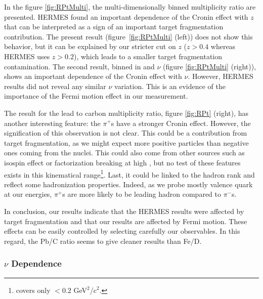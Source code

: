 In the figure \ref{fig:RPtMulti}, the multi-dimensionally binned multiplicity 
ratio are presented. HERMES found an important dependence of the Cronin effect 
with $z$ \cite{Airapetian:2007vu,Airapetian:2011jp} that can be interpreted as a 
sign of an important target fragmentation contribution. The present result 
(figure~\ref{fig:RPtMulti} (left)) does not show this behavior, but it can be 
explained by our stricter cut on $z$ ($z>0.4$ whereas HERMES uses $z>0.2$), which 
leads to a smaller target fragmentation contamination. The second result, 
binned in \pt and $\nu$ (figure \ref{fig:RPtMulti} (right)), shows an important 
dependence of the Cronin effect with $\nu$. However, HERMES results did not 
reveal any similar $\nu$ variation. This is an evidence of the importance of 
the Fermi motion effect in our measurement.

The result for the lead to carbon multiplicity ratio, figure \ref{fig:RPt} 
(right), has another interesting feature: the $\pi^+$s have a stronger Cronin 
effect. However, the signification of this observation is not clear. This could be 
a contribution from target fragmentation, as we might expect more positive 
particles than negative ones coming from the nuclei.
This could also come from other sources such as isospin effect or factorization breaking at high 
\ptp, but no test of these features exists in this kinematical range\footnote{
\cite{Asaturyan:2011mq} covers only \pt$<0.2$ GeV$^2$/c$^2$.}. Last, it could 
be linked to the hadron rank and reflect some hadronization properties. Indeed, 
as we probe mostly valence quark at our energies, $\pi^+$s are more likely to 
be leading hadron compared to $\pi^-$s.

In conclusion, our results indicate that the HERMES results were affected by target 
fragmentation and that our results are affected by Fermi motion. These effects can 
be easily controlled by selecting carefully our observables. In this regard, the
Pb/C ratio seems to give cleaner results than Fe/D.

\subsubsection{$\nu$ Dependence}

